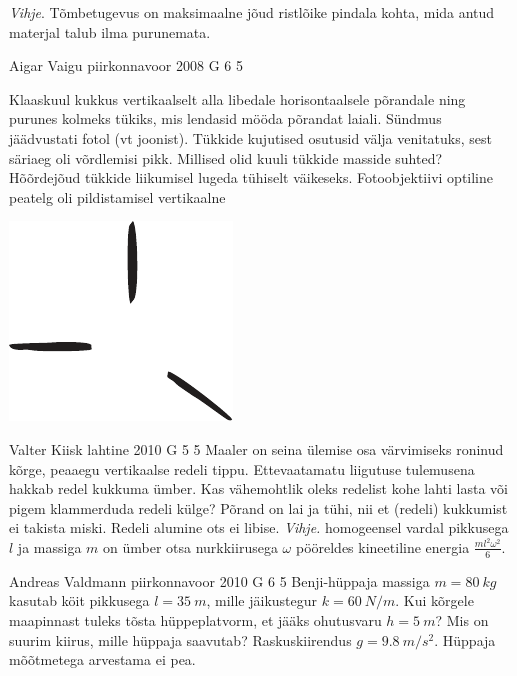 \documentclass[11pt, twoside]{article}
\begin{document}
{{\emph{Vihje}. Tõmbetugevus on maksimaalne jõud ristlõike pindala kohta, mida antud materjal talub ilma purunemata.
\fi
}

{Aigar Vaigu} %
{piirkonnavoor} %
{2008} %
{G 6} %
{5} %
{
\ifStatement
Klaaskuul kukkus vertikaalselt alla libedale horisontaalsele põrandale ning purunes kolmeks tükiks, mis lendasid mööda põrandat laiali. Sündmus jäädvustati fotol (vt joonist). Tükkide kujutised osutusid välja venitatuks, sest säriaeg oli võrdlemisi pikk. Millised olid kuuli tükkide masside suhted? Hõõrdejõud tükkide liikumisel lugeda tühiselt väikeseks. Fotoobjektiivi optiline peatelg oli pildistamisel vertikaalne

\begin{center}
	\includegraphics[width=0.6\linewidth]{2008-v2g-06-yl}
\end{center}
\fi
}

{Valter Kiisk} %
{lahtine} %
{2010} %
{G 5} %
{5} %
{
\ifStatement
Maaler on seina ülemise osa värvimiseks roninud kõrge, peaaegu vertikaalse
redeli tippu. Ettevaatamatu liigutuse tulemusena hakkab redel kukkuma ümber. Kas
vähemohtlik oleks redelist kohe lahti lasta või pigem klammerduda redeli külge?
Põrand on lai ja tühi, nii et (redeli) kukkumist ei takista miski. Redeli alumine
ots ei libise.
\emph{Vihje.} homogeensel vardal pikkusega $l$ ja massiga $m$ on ümber otsa
nurkkiirusega $\omega$ pööreldes kineetiline energia $\frac{m l^2 \omega^2}{6}$.
\fi
}

{Andreas Valdmann} %
{piirkonnavoor} %
{2010} %
{G 6} %
{5} %
{
\ifStatement
Benji-hüppaja massiga $m=\SI{80}{kg}$ kasutab köit pikkusega $l=\SI{35}{m}$, mille jäikustegur $k=\SI{60}{N/m}$. Kui kõrgele maapinnast tuleks tõsta hüppeplatvorm, et jääks ohutusvaru $h=\SI{5}{m}$? Mis on suurim kiirus, mille hüppaja saavutab? Raskuskiirendus $g=\SI{9.8}{m/s^2}$. Hüppaja mõõtmetega arvestama ei pea. 
\fi
}

}
\end{document}
